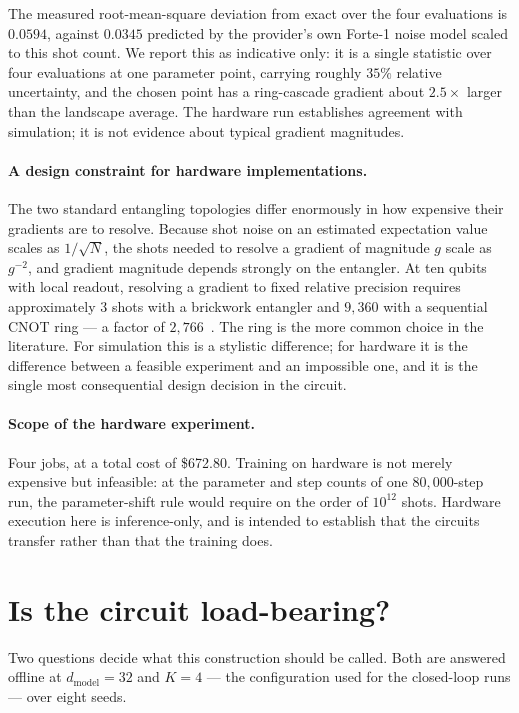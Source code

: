 \documentclass[11pt,onecolumn]{article}
\begin{document}
The measured root-mean-square deviation from exact over the four
evaluations is $0.0594$, against $0.0345$ predicted by the provider's
own Forte-1 noise model scaled to this shot count. We report this as
indicative only: it is a single statistic over four evaluations at one
parameter point, carrying roughly $35\%$ relative uncertainty, and the
chosen point has a ring-cascade gradient about $2.5\times$ larger than
the landscape average. The hardware run establishes agreement with
simulation; it is not evidence about typical gradient magnitudes.

\paragraph{A design constraint for hardware implementations.}
The two standard entangling topologies differ enormously in how
expensive their gradients are to resolve. Because shot noise on an
estimated expectation value scales as $1/\sqrt{N}$, the shots needed to
resolve a gradient of magnitude $g$ scale as $g^{-2}$, and gradient
magnitude depends strongly on the entangler. At ten qubits with local
readout, resolving a gradient to fixed relative precision requires
approximately $3$ shots with a brickwork entangler and $9{,}360$ with a
sequential CNOT ring --- a factor of $2{,}766$~\cite{papera}. The ring
is the more common choice in the literature. For simulation this is a
stylistic difference; for hardware it is the difference between a
feasible experiment and an impossible one, and it is the single most
consequential design decision in the circuit.

\paragraph{Scope of the hardware experiment.}
Four jobs, at a total cost of \$672.80. Training on hardware is not
merely expensive but infeasible: at the parameter and step counts of one
$80{,}000$-step run, the parameter-shift rule would require on the order
of $10^{12}$ shots. Hardware execution here is inference-only, and is
intended to establish that the circuits transfer rather than that the
training does.

\section{Is the circuit load-bearing?}\label{sec:ablation}
Two questions decide what this construction should be called. Both are
answered offline at $d_{\mathrm{model}} = 32$ and $K = 4$ --- the
configuration used for the closed-loop runs --- over eight seeds.
\end{document}
